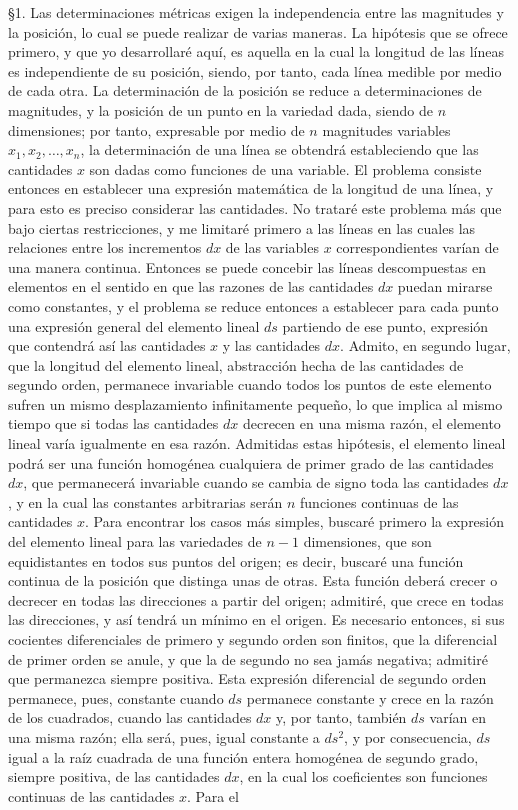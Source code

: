 \documentclass[a4paper, 12pt]{article}
\begin{document}
\S 1.\hspace{3 mm} Las determinaciones métricas exigen la independencia entre las magnitudes  y la posición, lo cual se puede realizar de varias maneras. La hipótesis que se ofrece primero, y que yo desarrollaré aquí, es aquella en la cual la longitud de las líneas es independiente de su posición, siendo, por tanto, cada línea medible por medio de cada otra. La determinación de la posición se reduce a determinaciones de magnitudes, y la posición de un punto en la variedad dada, siendo de $n$ dimensiones; por tanto, expresable por medio de $n$ magnitudes variables $x_1,x_2, \dots ,x_n$, la determinación de una línea se obtendrá estableciendo que las cantidades $x$ son dadas como funciones de una variable. El problema consiste entonces en establecer una expresión matemática de la longitud de una línea, y para esto es preciso considerar las cantidades. No trataré este problema más que bajo ciertas restricciones, y me limitaré primero a las líneas en las cuales las relaciones entre los incrementos $dx$  de las variables $x$ correspondientes varían de una manera continua. Entonces se puede concebir las líneas descompuestas en elementos en el sentido en que las  razones de las cantidades $dx$  puedan mirarse como constantes, y el problema se reduce entonces a establecer para cada punto una expresión general del elemento lineal $ds$ partiendo de ese punto, expresión que contendrá así las cantidades $x$ y las cantidades $dx$. Admito, en segundo lugar, que la longitud del elemento lineal, abstracción hecha de las cantidades de segundo orden, permanece invariable cuando todos los puntos de este elemento sufren un mismo desplazamiento infinitamente pequeño, lo que implica al mismo tiempo que si todas las cantidades $dx$ decrecen en una misma razón, el elemento lineal varía igualmente en esa razón. Admitidas estas hipótesis, el elemento lineal podrá ser una función homogénea cualquiera de primer grado de las cantidades $dx$, que permanecerá invariable cuando se cambia de signo toda las cantidades $dx$, y en la cual las constantes arbitrarias serán $n$ funciones continuas de las cantidades $x$. Para encontrar los casos más simples, buscaré primero la expresión del elemento lineal para las variedades de $n-1$ dimensiones, que son equidistantes en todos sus puntos del origen; es decir, buscaré una función continua de la posición que distinga unas de otras. Esta función deberá crecer o decrecer en todas las direcciones a partir del origen; admitiré, que crece en todas las direcciones, y así tendrá un mínimo en el origen. Es necesario entonces, si sus cocientes diferenciales de primero y segundo orden son finitos, que la diferencial de primer orden se anule, y que la de segundo no sea jamás negativa; admitiré que permanezca siempre positiva. Esta expresión diferencial de segundo orden permanece, pues, constante cuando $ds$ permanece constante y crece en la razón de los cuadrados, cuando las cantidades $dx$ y, por tanto, también $ds$ varían en una misma razón; ella será, pues,  igual constante a $ds^2$, y por consecuencia, $ds$ igual a la raíz cuadrada de una función entera homogénea de segundo grado, siempre positiva, de las cantidades $dx$, en la cual los coeficientes son funciones continuas de las cantidades $x$. Para el 
\end{document}
